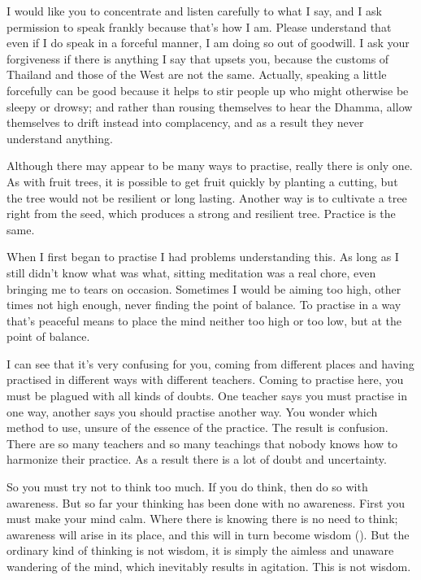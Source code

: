 I would like you to concentrate and listen carefully to what I say, and I ask permission to speak frankly because that's how I am. Please understand that even if I do speak in a forceful manner, I am doing so out of goodwill. I ask your forgiveness if there is anything I say that upsets you, because the customs of Thailand and those of the West are not the same. Actually, speaking a little forcefully can be good because it helps to stir people up who might otherwise be sleepy or drowsy; and rather than rousing themselves to hear the Dhamma, allow themselves to drift instead into complacency, and as a result they never understand anything. 

Although there may appear to be many ways to practise, really there is only one. As with fruit trees, it is possible to get fruit quickly by planting a cutting, but the tree would not be resilient or long lasting. Another way is to cultivate a tree right from the seed, which produces a strong and resilient tree. Practice is the same. 

When I first began to practise I had problems understanding this. As long as I still didn't know what was what, sitting meditation was a real chore, even bringing me to tears on occasion. Sometimes I would be aiming too high, other times not high enough, never finding the point of balance. To practise in a way that's peaceful means to place the mind neither too high or too low, but at the point of balance. 

I can see that it's very confusing for you, coming from different places and having practised in different ways with different teachers. Coming to practise here, you must be plagued with all kinds of doubts. One teacher says you must practise in one way, another says you should practise another way. You wonder which method to use, unsure of the essence of the practice. The result is confusion. There are so many teachers and so many teachings that nobody knows how to harmonize their practice. As a result there is a lot of doubt and uncertainty. 

So you must try not to think too much. If you do think, then do so with awareness. But so far your thinking has been done with no awareness. First you must make your mind calm. Where there is knowing there is no need to think; awareness will arise in its place, and this will in turn become wisdom (). But the ordinary kind of thinking is not wisdom, it is simply the aimless and unaware wandering of the mind, which inevitably results in agitation. This is not wisdom. 

